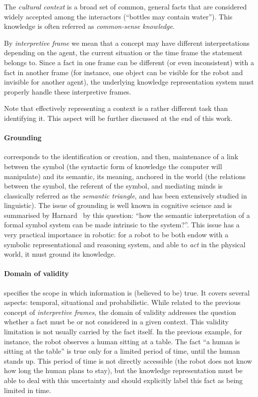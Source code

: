 The \textit{cultural context} is a broad set of common, general facts that are
considered widely accepted among the interactors (\eg ``bottles may contain
water''). This knowledge is often referred as \emph{common-sense knowledge}.

By \emph{interpretive frame} we mean that a concept may have different
interpretations depending on the agent, the current situation or the time frame
the statement belongs to. Since a fact in one frame can be different (or even
inconsistent) with a fact in another frame (for instance, one object can be
visible for the robot and invisible for another agent), the underlying
knowledge representation system must properly handle these interpretive
frames.

Note that effectively representing a context is a rather different task than
identifying it. This aspect will be further discussed at the end of this work.

\paragraph{Grounding} corresponds to the identification or creation, and then,
maintenance of a link between the symbol (the syntactic form of knowledge
the computer will manipulate) and its semantic, \ie its meaning, anchored in
the world (the relations between the symbol, the referent of the symbol, and
mediating minds is classically referred as the \emph{semantic triangle}, and has
been extensively studied in linguistic). The issue of grounding is well known
in cognitive science and is summarised by Harnard~\cite{Harnad1990} by this
question: ``how the semantic interpretation of a formal symbol system can be
made intrinsic to the system?''. This issue has a very practical importance in
robotic: for a robot to be both endow with a symbolic representational and
reasoning system, and able to \emph{act} in the physical world, it must ground
its knowledge.



\paragraph{Domain of validity} specifies the scope in which
 information is (believed to be) true. It covers several aspects: temporal,
situational and probabilistic. While related to the previous concept of
\emph{interpretive frames}, the domain of validity addresses the question
whether a fact must be or not considered in a given context. This validity
limitation is not usually carried by the fact itself. In the previous example,
for instance, the robot observes a human sitting at a table.  The fact ``a
human is sitting at the table'' is true only for a limited period of time,
until the human stands up. This period of time is not directly accessible
(the robot does not know how long the human plans to stay), but the
knowledge representation must be able to deal with this uncertainty and
should explicitly label this fact as being limited in time.

